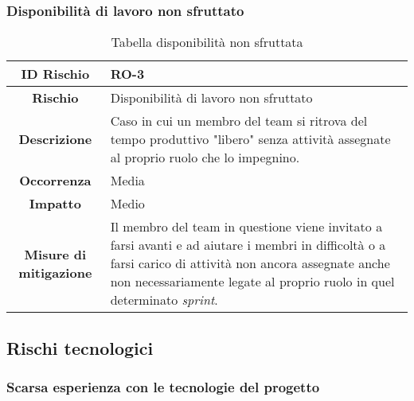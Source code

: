 \documentclass[10pt, a4paper]{article}
\begin{document}
{{\subsubsection{Disponibilità di lavoro non sfruttato}

{\renewcommand{\arraystretch}{1.5}
\begin{table}[H]
\begin{tabularx}{\textwidth}{c|X}
\textbf{ID Rischio} & RO-3 \\
\hline
\textbf{Rischio} & Disponibilità di lavoro non sfruttato \\
\hline
\textbf{Descrizione} & Caso in cui un membro del team si ritrova del tempo produttivo "libero" senza attività assegnate al proprio ruolo che lo impegnino.\\
\hline
\textbf{Occorrenza} & Media\\
\hline
\textbf{Impatto} & Medio\\
\hline
\textbf{Misure di mitigazione} & Il membro del team in questione viene invitato a farsi avanti e ad aiutare i membri in difficoltà o a farsi carico di attività non ancora assegnate anche non necessariamente legate al proprio ruolo in quel determinato \textit{sprint}. \\

\end{tabularx}
\caption{Tabella disponibilità non sfruttata}
\end{table}




\subsection{Rischi tecnologici}

\subsubsection{Scarsa esperienza con le tecnologie del progetto}

}}}
\end{document}
